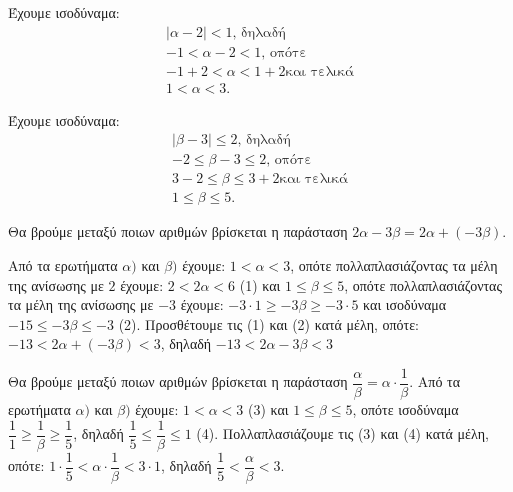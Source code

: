 
\begin{alist}
\item Έχουμε ισοδύναμα:
\begin{gather*}
|\alpha - 2| < 1\text{, δηλαδή} \\
-1 < \alpha - 2 < 1\text{, οπότε} \\
-1 + 2 < \alpha < 1 + 2\text{και τελικά} \\
1 < \alpha < 3.
\end{gather*}

\item Έχουμε ισοδύναμα:
\begin{gather*}
|\beta - 3| \le 2\text{, δηλαδή} \\
-2 \le \beta - 3 \le 2\text{, οπότε} \\
3 - 2 \le \beta \le 3 + 2\text{και τελικά} \\
1 \le \beta \le 5.
\end{gather*}

\item Θα βρούμε μεταξύ ποιων αριθμών βρίσκεται η παράσταση $2\alpha - 3\beta = 2\alpha + (-3\beta)$.

Από τα ερωτήματα $\alpha)$ και $\beta)$ έχουμε:
$1 < \alpha < 3$, οπότε πολλαπλασιάζοντας τα μέλη της ανίσωσης με $2$ έχουμε:
$2 < 2\alpha < 6$ (1)
και $1 \le \beta \le 5$, οπότε πολλαπλασιάζοντας τα μέλη της ανίσωσης με $-3$ έχουμε:
$-3 \cdot 1 \ge -3\beta \ge -3 \cdot 5$ και ισοδύναμα
$-15 \le -3\beta \le -3$ (2).
Προσθέτουμε τις (1) και (2) κατά μέλη, οπότε:
$-13 < 2\alpha + (-3\beta) < 3$, δηλαδή $-13 < 2\alpha - 3\beta < 3$

\item Θα βρούμε μεταξύ ποιων αριθμών βρίσκεται η παράσταση $\dfrac{\alpha}{\beta} = \alpha \cdot \dfrac{1}{\beta}$.
Από τα ερωτήματα $\alpha)$ και $\beta)$ έχουμε:
$1 < \alpha < 3$ (3)
και $1 \le \beta \le 5$, οπότε ισοδύναμα $\dfrac{1}{1} \ge \dfrac{1}{\beta} \ge \dfrac{1}{5}$, δηλαδή
$\dfrac{1}{5} \le \dfrac{1}{\beta} \le 1$ (4).
Πολλαπλασιάζουμε τις (3) και (4) κατά μέλη, οπότε: $1 \cdot \dfrac{1}{5} < \alpha \cdot \dfrac{1}{\beta} < 3 \cdot 1$, δηλαδή $\dfrac{1}{5} < \dfrac{\alpha}{\beta} < 3$.
\end{alist}

